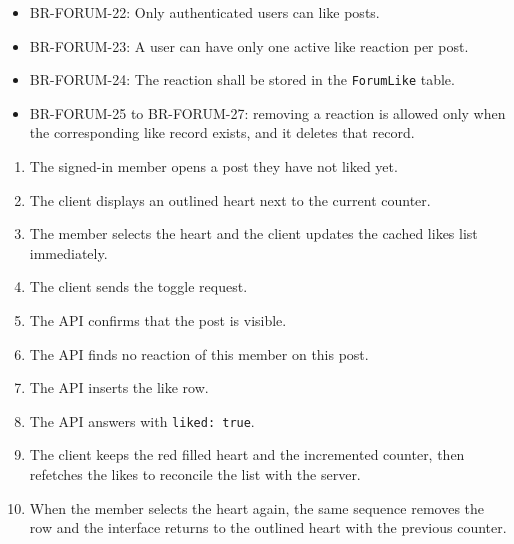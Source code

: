 \begin{itemize}[leftmargin=1.6em,topsep=3pt,itemsep=2pt,parsep=0pt,label=$\bullet$]\brrulelist
      \item BR-FORUM-22: Only authenticated users can like posts.
      \item BR-FORUM-23: A user can have only one active like reaction per post.
      \item BR-FORUM-24: The reaction shall be stored in the \texttt{ForumLike} table.
      \item BR-FORUM-25 to BR-FORUM-27: removing a reaction is allowed only when the
            corresponding like record exists, and it deletes that record.
\end{itemize}

\begin{enumerate}[leftmargin=1.8em,topsep=3pt,itemsep=2pt,parsep=0pt]
      \item The signed-in member opens a post they have not liked yet.
      \item The client displays an outlined heart next to the current counter.
      \item The member selects the heart and the client updates the cached likes list
            immediately.
      \item The client sends the toggle request.
      \item The API confirms that the post is visible.
      \item The API finds no reaction of this member on this post.
      \item The API inserts the like row.
      \item The API answers with \texttt{liked: true}.
      \item The client keeps the red filled heart and the incremented counter, then
            refetches the likes to reconcile the list with the server.
      \item When the member selects the heart again, the same sequence removes the row and
            the interface returns to the outlined heart with the previous counter.
\end{enumerate}

